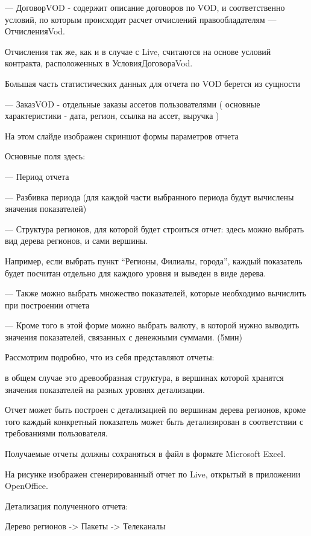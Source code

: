 \documentclass[a4paper]{article}
\begin{document}
--- ДоговорVOD - содержит описание договоров по VOD, и соответственно условий, по которым происходит 
расчет отчислений правообладателям --- ОтчисленияVod.

Отчисления так же, как и в случае с Live, считаются на основе условий контракта, расположенных в УсловияДоговораVod.

\newpage

Большая часть статистических данных для отчета по VOD берется из сущности

--- ЗаказVOD - отдельные заказы ассетов пользователями ( основные характеристики - дата, регион, ссылка на ассет, выручка )

\newpage
На этом слайде изображен скриншот формы параметров отчета

Основные поля здесь:

--- Период отчета

--- Разбивка периода (для каждой части выбранного периода будут вычислены значения показателей)

\newpage
--- Структура регионов, для которой будет строиться отчет: здесь можно выбрать вид дерева регионов, и сами вершины.

Например, если выбрать пункт “Регионы, Филиалы, города”, каждый показатель будет посчитан отдельно для каждого уровня и выведен в виде дерева.


\newpage
--- Также можно выбрать множество показателей, которые необходимо вычислить при построении отчета

--- Кроме того в этой форме можно выбрать валюту, в которой нужно выводить значения показателей, связанных с денежными суммами.
(5мин)

\newpage
Рассмотрим подробно, что из себя представляют отчеты:

в общем случае это древообразная структура, в вершинах которой хранятся значения показателей
на разных уровнях детализации.

Отчет может быть построен с детализацией 
по вершинам дерева регионов, кроме того каждый конкретный показатель может быть детализирован
в соответствии с требованиями пользователя.

Получаемые отчеты должны сохраняться в файл в формате Microsoft Excel.

\newpage
На рисунке изображен сгенерированный отчет по Live, открытый в приложении OpenOffice.

Детализация полученного отчета:

Дерево регионов -> Пакеты -> Телеканалы
\end{document}
